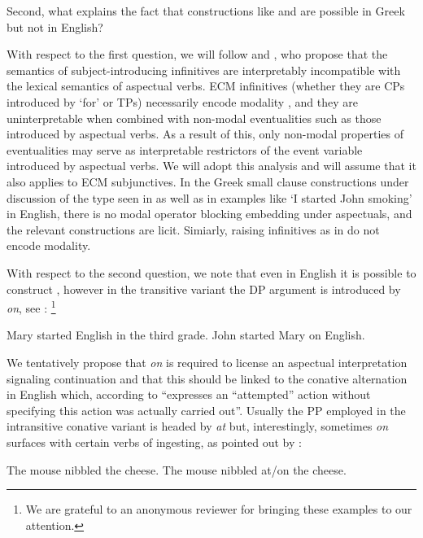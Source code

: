 \documentclass[output=paper]{langscibook}
\begin{document}
Second, what explains the fact that constructions like  and  are possible in Greek but not in English?

With respect to the first question, we will follow \citet{Grano2016} and \citet{MourounasWilliamson2019}, 
who propose that the semantics of subject-introducing infinitives are interpretably incompatible with the lexical semantics of aspectual verbs. 
ECM infinitives (whether they are CPs introduced by ‘for’ or TPs) necessarily encode modality 
\citep{kratzer2006,Moulton2009,Grano2016}, 
and they are uninterpretable when combined with non-modal eventualities such as those introduced by aspectual verbs. 
As a result of this, only non-modal properties of eventualities may serve as interpretable restrictors of the event variable introduced by aspectual verbs. 
We will adopt this analysis and will assume that it also applies to ECM subjunctives. 
In the Greek small clause constructions under discussion of the type seen in  as well as in examples like ‘I started John smoking’ in English, 
there is no modal operator blocking embedding under aspectuals, and the relevant constructions are licit. Simiarly, raising infinitives as in  do not encode modality.

With respect to the second question, we note that even in English it is possible to construct , 
however in the transitive variant the DP argument is introduced by \textit{on}, see \citet{Levin1993}:%
\footnote{
    We are grateful to an anonymous reviewer for bringing these examples to our attention.
}

\ea%
    \label{alexiadouex:key:20}
    \ea 
        \label{alexiadouex:key:20a}
        Mary started English in the third grade.
    \ex 
        \label{alexiadouex:key:20b}
        John started Mary on English.
    \z 
\z

We tentatively propose that \textit{on} is required to license an aspectual interpretation signaling continuation 
and that this should be linked to the conative alternation in English 
which, according to \citet[42]{Levin1993} “expresses an “attempted” action without specifying this action was actually carried out”. 
Usually the PP employed in the intransitive conative variant is headed by \textit{at} 
but, interestingly, sometimes \textit{on} surfaces with certain verbs of ingesting, as pointed out by \citet{Levin1993}:

\ea%
    \label{alexiadouex:key:21}
    \ea The mouse  nibbled  the cheese. 
    \ex The mouse  nibbled  at/on the cheese. 
    \z 
\z 
    
\end{document}
